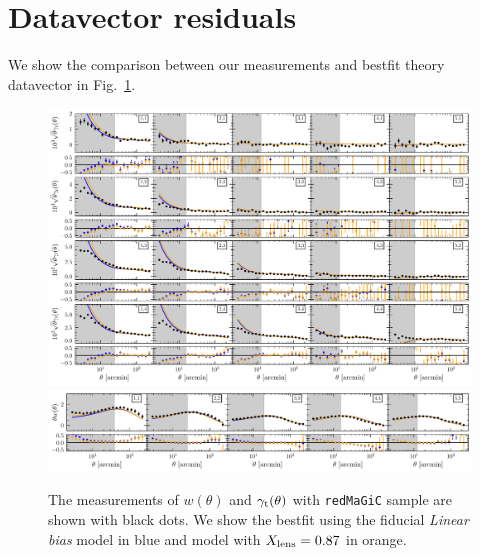 \documentclass[aps, prd,twocolumn,superscriptaddress,nofootinbib,preprintnumbers]{revtex4-1}
\newcommand{\gammat}{\ensuremath{\gamma_{\rm t}(\theta)}}
\newcommand{\wtheta}{\ensuremath{w(\theta)}}
\newcommand{\redmagic}{\texttt{redMaGiC} }
\newcommand{\IR}[1]{{\color{red}[\textbf{Note for IR}: #1]}}
\begin{document}
\section{Datavector residuals}
We show the comparison between our measurements and bestfit theory datavector in Fig.~\ref{fig:data_2pt}. 

\begin{figure}
\includegraphics[width=\textwidth]{figs/gt_wx_data.pdf}
\includegraphics[width=\textwidth]{figs/wt_wx_data.pdf}
\caption[]{The measurements of $\wtheta$ and $\gammat$ with \redmagic sample are shown with black dots. We show the bestfit using the fiducial \textit{Linear bias} model in blue and model with $X_{\rm lens}=0.87$ in orange.  }
\label{fig:data_2pt}
\end{figure}
\end{document}
